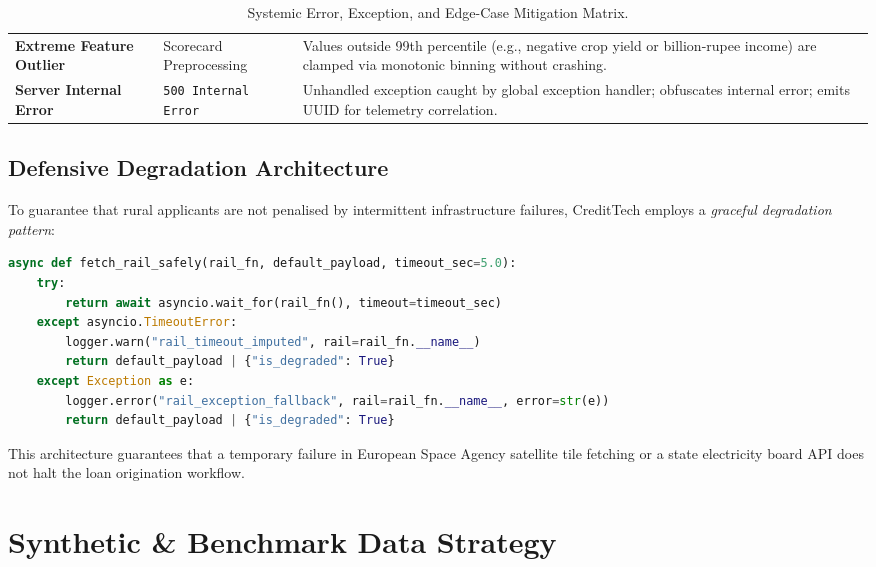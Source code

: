 \documentclass[11pt,a4paper,oneside]{report}
\begin{document}
\begin{table}[H]
\begin{tabularx}{\textwidth}{p{3.2cm} p{3.6cm} X}
  \addlinespace
  \textbf{Extreme Feature Outlier} & Scorecard Preprocessing & Values outside 99th percentile (e.g., negative crop yield or billion-rupee income) are clamped via monotonic binning without crashing. \\
  \addlinespace
  \textbf{Server Internal Error} & \texttt{500 Internal Error} & Unhandled exception caught by global exception handler; obfuscates internal error; emits UUID for telemetry correlation. \\
  \bottomrule
\end{tabularx}
\caption{Systemic Error, Exception, and Edge-Case Mitigation Matrix.}
\label{tab:error_matrix}
\end{table}

\section{Defensive Degradation Architecture}
To guarantee that rural applicants are not penalised by intermittent infrastructure failures, CreditTech employs a \textit{graceful degradation pattern}:
\begin{lstlisting}[language=Python, caption={Defensive Rail Execution with Imputation Fallback.}]
async def fetch_rail_safely(rail_fn, default_payload, timeout_sec=5.0):
    try:
        return await asyncio.wait_for(rail_fn(), timeout=timeout_sec)
    except asyncio.TimeoutError:
        logger.warn("rail_timeout_imputed", rail=rail_fn.__name__)
        return default_payload | {"is_degraded": True}
    except Exception as e:
        logger.error("rail_exception_fallback", rail=rail_fn.__name__, error=str(e))
        return default_payload | {"is_degraded": True}
\end{lstlisting}
This architecture guarantees that a temporary failure in European Space Agency satellite tile fetching or a state electricity board API does not halt the loan origination workflow.




\chapter{Synthetic \& Benchmark Data Strategy}
\label{chap:data_strategy}
\end{document}
